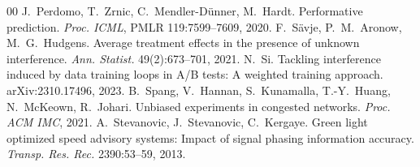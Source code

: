\begin{thebibliography}{00}
 J.~Perdomo, T.~Zrnic, C.~Mendler-D\"unner, M.~Hardt. Performative prediction. \emph{Proc. ICML}, PMLR 119:7599--7609, 2020.
 F.~S\"avje, P.~M.~Aronow, M.~G.~Hudgens. Average treatment effects in the presence of unknown interference. \emph{Ann. Statist.} 49(2):673--701, 2021.
 N.~Si. Tackling interference induced by data training loops in A/B tests: A weighted training approach. arXiv:2310.17496, 2023.
 B.~Spang, V.~Hannan, S.~Kunamalla, T.-Y.~Huang, N.~McKeown, R.~Johari. Unbiased experiments in congested networks. \emph{Proc. ACM IMC}, 2021.
 A.~Stevanovic, J.~Stevanovic, C.~Kergaye. Green light optimized speed advisory systems: Impact of signal phasing information accuracy. \emph{Transp. Res. Rec.} 2390:53--59, 2013.
\end{thebibliography}



